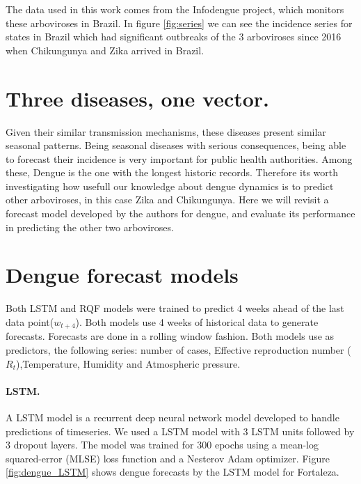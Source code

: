 \documentclass[a0,portrait]{a0poster}
\begin{document}
\begin{multicols}{3}
The data used in this work comes from the Infodengue project, which monitors 
these arboviroses in Brazil. In figure \ref{fig:series} we can see the 
incidence series for states in Brazil which had significant outbreaks of the 3 
arboviroses since 2016 when Chikungunya and Zika arrived in Brazil.

\section*{Three diseases, one vector.}

\noindent
Given their similar transmission mechanisms, these diseases present similar 
seasonal patterns. Being seasonal diseases with serious consequences, being 
able to forecast their incidence is very important for public health 
authorities. Among these, Dengue is the one with the longest historic records. 
Therefore its worth investigating how usefull our knowledge about dengue 
dynamics is to predict other arboviroses, in this case Zika and Chikungunya. 
Here we will revisit a forecast model developed by the authors for dengue, and 
evaluate its performance in predicting the other two arboviroses.

\section*{Dengue forecast models}
Both LSTM and RQF models were trained to predict 4 weeks ahead of the last data 
point($w_{t+4}$). Both models use 4 weeks of historical data to generate 
forecasts. Forecasts are done in a rolling window fashion. Both models use as 
predictors, the following series: number of cases, Effective reproduction 
number ($R_t$),Temperature, Humidity and Atmospheric pressure.
\paragraph*{LSTM.}
A LSTM model is a recurrent deep neural network model developed to handle 
predictions of timeseries. We used a LSTM model with 3 LSTM units followed by 
3 dropout layers. The model was trained for 300 epochs using a mean-log 
squared-error (MLSE) loss function  and a Nesterov Adam 
optimizer\cite{sutskever2013importance}. Figure \ref{fig:dengue_LSTM} shows 
dengue forecasts by the LSTM model for Fortaleza.


\end{multicols}
\end{document}
